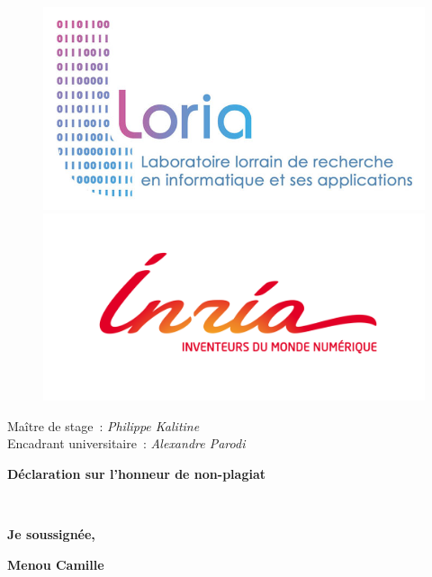 \documentclass[12pt]{article}
\begin{document}
\begin{center}
\begin{figure}[h]
  \begin{minipage}[c]{.46\linewidth}
    \centering
    \includegraphics[scale=0.3]{gallery/loria.jpg}
  \end{minipage}
  \hfill
  \begin{minipage}[c]{.46\linewidth}
    \centering
    \includegraphics[scale=0.20]{gallery/inria.png}
  \end{minipage}
\end{figure}
\end{center}

\vspace{3cm}
{\raggedright
Maître de stage~: \textit{Philippe Kalitine}
\\
Encadrant universitaire~: \textit{Alexandre Parodi}\pagebreak{}
}

\begin{center}
\textbf{{\huge Déclaration sur l'honneur de non-plagiat}}
\thispagestyle{empty}
\end{center}

$ $

\textbf{Je soussignée,}

\textbf{Menou Camille}
\end{document}
